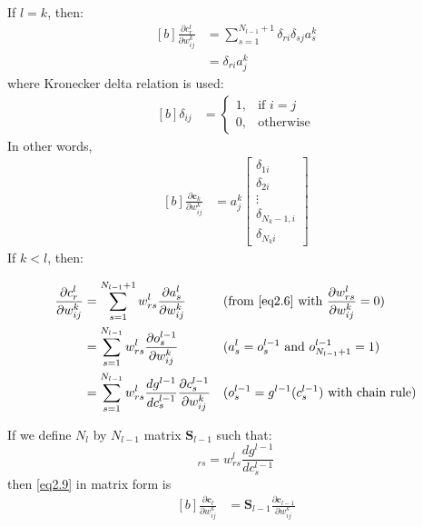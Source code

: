 \documentclass[letterpaper, 11pt]{article}
\newcommand{\pd}[2]{\frac{\partial#1}{\partial#2}}
\newcommand{\td}[2]{\frac{d#1}{d#2}}
\newcommand{\w}{w^{k}_{ij}}
\numberwithin{equation}{section}
\numberwithin{figure}{section}
\numberwithin{table}{section}
\begin{document}
If \(l = k\), then:
\begin{equation}
	\begin{aligned}[b]
		\pd{c^{l}_{r}}{\w}
		&= \sum_{s=1}^{N_{l-1}+1} \delta_{ri}\delta_{sj}a^{k}_{s}\\
		&= \delta_{ri}a^{k}_{j}
	\end{aligned}
\end{equation}
where Kronecker delta relation is used:
\begin{equation}
	\begin{aligned}[b]
		\delta_{ij}	&=\begin{cases}
				1, 	&\text{if } i=j\\
				0,	&\text{otherwise}
		\end{cases}
	\end{aligned}
\end{equation}
In other words,
\begin{equation}
	\begin{aligned}[b]
		\pd{\textbf{c}_{k}}{\w}
		&= a^{k}_{j}	\begin{bmatrix}
				\delta_{1i}\\
				\delta_{2i}\\
				\vdots\\
				\delta_{N_{k}-1,i}\\
				\delta_{N_{k}i}
				\end{bmatrix}
	\end{aligned}
\end{equation}
If \(k < l\), then:

\begin{equation}
	\begin{aligned}[b]
		\pd{c^{l}_{r}}{\w} 
		&= \sum_{s=1}^{N_{l-1}+1}w^{l}_{rs}\pd{a^{l}_{s}}{\w}
			&&(\text{from }\ref{eq2.6}\text{ with }\pd{w^{l}_{rs}}{\w}=0)\\
		&= \sum_{s=1}^{N_{l-1}}w^{l}_{rs}\pd{o^{l-1}_{s}}{\w}
			&&(a^{l}_{s} = o^{l-1}_{s}\text{ and } o^{l-1}_{N_{l-1}+1} = 1)\\
		&= \sum_{s=1}^{N_{l-1}}w^{l}_{rs}\td{g^{l-1}}{c^{l-1}_{s}}\pd{c^{l-1}_{s}}{\w}
			&&(o^{l-1}_{s} = g^{l-1}(c^{l-1}_{s})\text{ with chain rule})\label{eq2.9}
	\end{aligned}
\end{equation}

If we define \(N_{l}\) by \(N_{l-1}\) matrix \(\textbf{S}_{l-1}\) such that:
\begin{equation}
	[\textbf{S}_{l-1}]_{rs} = w^{l}_{rs}\td{g^{l-1}}{c^{l-1}_{s}}
\end{equation}
then \ref{eq2.9} in matrix form is 
\begin{equation}
	\begin{aligned}[b]
		\pd{\textbf{c}_{l}}{\w} 
		&= \textbf{S}_{l-1}\pd{\textbf{c}_{l-1}}{\w}\label{eq2.11}
	\end{aligned}
\end{equation}
\end{document}
